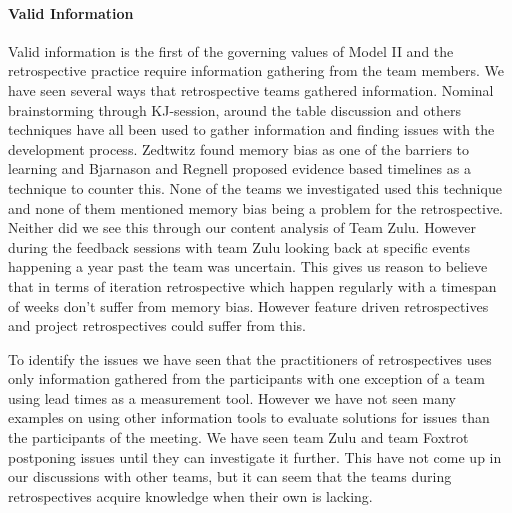 \paragraph{Valid Information}
Valid information is the first of the governing values of Model II and the retrospective practice require information gathering from the team members. We have seen several ways that retrospective teams gathered information. Nominal brainstorming through KJ-session, around the table discussion and others techniques have all been used to gather information and finding issues with the development process. Zedtwitz\cite{Zedtwitz2002} found memory bias as one of the barriers to learning and Bjarnason and Regnell\cite{Bjarnason2012} proposed evidence based timelines as a technique to counter this. None of the teams we investigated used this technique and none of them mentioned memory bias being a problem for the retrospective. Neither did we see this through our content analysis of Team Zulu. However during the feedback sessions with team Zulu looking back at specific events happening a year past the team was uncertain. This gives us reason to believe that in terms of iteration retrospective which happen regularly with a timespan of weeks don't suffer from memory bias. However feature driven retrospectives and project retrospectives could suffer from this. 

To identify the issues we have seen that the practitioners of retrospectives uses only information gathered from the participants with one exception of a team using lead times as a measurement tool. However we have not seen many examples on using other information tools to evaluate solutions for issues than the participants of the meeting. We have seen team Zulu and team Foxtrot postponing issues until they can investigate it further. This have not come up in our discussions with other teams, but it can seem that the teams during retrospectives acquire knowledge when their own is lacking.


